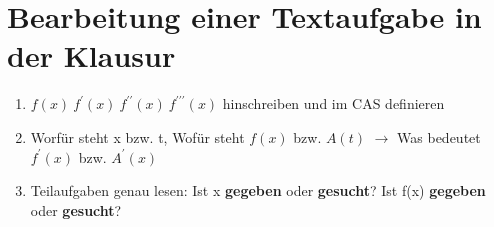 \documentclass[a4paper,12pt]{article}
\begin{document}
	\section*{Bearbeitung einer Textaufgabe in der Klausur}
	\begin{enumerate}
		\item $f(x) \ f^{\prime}(x) \ f^{\prime\prime}(x) \ f^{\prime\prime\prime}(x)$ hinschreiben und im CAS definieren
		\item Worfür steht x bzw. t, Wofür steht $f(x)$ bzw. $A(t)$ $\rightarrow$ Was bedeutet $f^{\prime}(x)$ bzw. $A^{\prime}(x)$
		\item Teilaufgaben genau lesen: Ist x \textbf{gegeben} oder \textbf{gesucht}? Ist f(x) \textbf{gegeben} oder \textbf{gesucht}?	
	\end{enumerate}	
\end{document}
